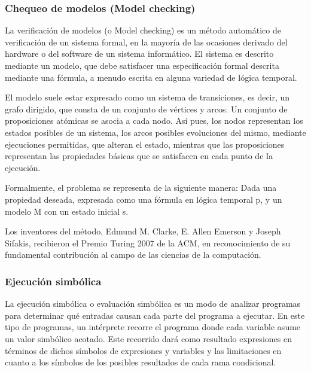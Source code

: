 \subsubsection*{Chequeo de modelos (Model checking)}

La verificaci\'on de modelos (o Model checking) es un m\'etodo autom\'atico de verificaci\'on de un sistema formal, en la mayor\'ia de las ocasiones derivado del hardware o del software de un sistema inform\'atico. El sistema es descrito mediante un modelo, que debe satisfacer una especificaci\'on formal descrita mediante una f\'ormula, a menudo escrita en alguna variedad de l\'ogica temporal.

El modelo suele estar expresado como un sistema de transiciones, es decir, un grafo dirigido, que consta de un conjunto de v\'ertices y arcos. Un conjunto de proposiciones at\'omicas se asocia a cada nodo. As\'i pues, los nodos representan los estados posibles de un sistema, los arcos posibles evoluciones del mismo, mediante ejecuciones permitidas, que alteran el estado, mientras que las proposiciones representan las propiedades b\'asicas que se satisfacen en cada punto de la ejecuci\'on.

Formalmente, el problema se representa de la siguiente manera: Dada una propiedad deseada, expresada como una f\'ormula en l\'ogica temporal p, y un modelo M con un estado inicial s.

Los inventores del m\'etodo, Edmund M. Clarke, E. Allen Emerson y Joseph Sifakis, recibieron el Premio Turing 2007 de la ACM, en reconocimiento de su fundamental contribuci\'on al campo de las ciencias de la computaci\'on.

\subsubsection*{Ejecuci\'on simb\'olica}

La ejecuci\'on simb\'olica o evaluaci\'on simb\'olica es un modo de analizar programas para determinar qu\'e entradas causan cada parte del programa a ejecutar. En este tipo de programas, un int\'erprete recorre el programa donde cada variable asume un valor simb\'olico acotado. Este recorrido dar\'a como resultado expresiones en t\'erminos de dichos s\'imbolos de expresiones y variables y las limitaciones en cuanto a los s\'imbolos de los posibles resultados de cada rama condicional. 

